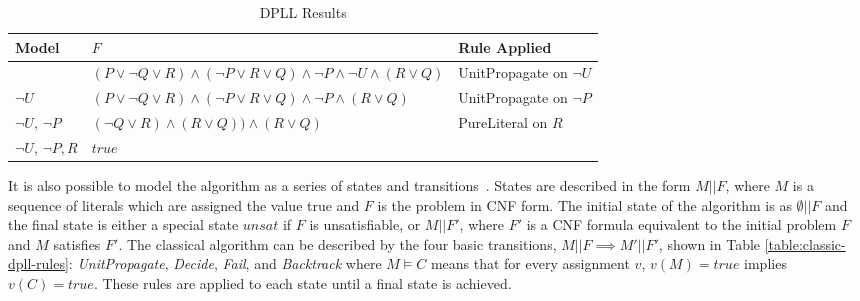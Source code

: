 \documentclass[]{final_report}
\begin{document}
\begin{table}[t]
\centering
\begin{tabular}{|p{2cm}|p{4.2cm}|p{9cm}|}
\hline
Model & $F$ & Rule Applied \\ \hline
{} & $(P \lor \lnot{Q} \lor R) \land (\lnot{P} \lor R \lor Q) \land \lnot{P} \land \lnot{U} \land (R \lor Q)$ & UnitPropagate on $\lnot{U}$   \\ \hline
{$\lnot{U}$} & $(P \lor \lnot{Q} \lor R) \land (\lnot{P} \lor R \lor Q) \land \lnot{P} \land (R \lor Q)$ & UnitPropagate on $\lnot{P}$   \\ \hline
{$\lnot{U}$, $\lnot{P}$} & $(\lnot{Q} \lor R) \land (R \lor Q)) \land (R \lor Q)$ & PureLiteral on $R$    \\ \hline
{$\lnot{U}$, $\lnot{P}, R$} & $true$ &     \\ \hline
\end{tabular}
\caption{DPLL Results}
\label{table:dpll-results}
\end{table}

It is also possible to model the algorithm as a series of states and transitions~\cite{nieuwenhuis2006solving}. States are described in the form $M || \mathit{F}$, where $M$ is a sequence of literals which are assigned the value true and $\mathit{F}$ is the problem in CNF form. The initial state of the algorithm is as $\emptyset || \mathit{F}$ and the final state is either a special state $unsat$ if $\mathit{F}$ is unsatisfiable, or $M || F'$, where $F'$ is a CNF formula equivalent to the initial problem $F$ and $M$ satisfies $F'$. The classical algorithm can be described by the four basic transitions, $M || \mathit{F} \implies M' || \mathit{F'} $, shown in Table \ref{table:classic-dpll-rules}: \textit{UnitPropagate}, \textit{Decide}, \textit{Fail}, and \textit{Backtrack} where $M \models C$ means that for every assignment $v$, $v(M) = true$ implies $v(C) = true$. These rules are applied to each state until a final state is achieved.
\end{document}
